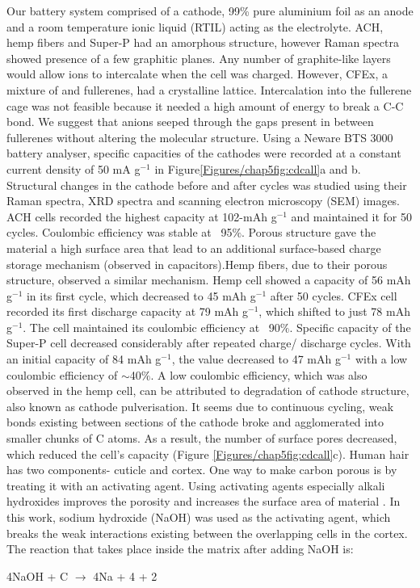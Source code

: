 Our battery system comprised of a cathode, 99\% pure aluminium foil as an anode and a room temperature ionic liquid (RTIL) acting as the electrolyte. ACH, hemp fibers and Super-P had an amorphous structure, however Raman spectra showed presence of a few graphitic planes. Any number of graphite-like layers would allow  ions to intercalate when the cell was charged. However, CFEx, a mixture of  and  fullerenes, had a crystalline lattice. Intercalation into the fullerene cage was not feasible because it needed a high amount of energy to break a C-C bond. We suggest that  anions seeped through the gaps present in between fullerenes without altering the molecular structure. Using a Neware BTS 3000 battery analyser, specific capacities of the cathodes were recorded at a constant current density of 50 mA g$^{-1}$ in Figure\ref{Figures/chap5fig:cdcall}a and b. Structural changes in the cathode before and after cycles was studied using their Raman spectra, XRD spectra and scanning electron microscopy (SEM) images.
ACH cells recorded the highest capacity at 102-mAh g$^{-1}$ and maintained it for 50 cycles. Coulombic efficiency was stable at ~95$\%$. Porous structure gave the material a high surface area that lead to an additional surface-based charge storage mechanism (observed in capacitors).Hemp fibers, due to their porous structure, observed a similar mechanism. Hemp cell showed a capacity of 56 mAh g$^{-1}$ in its first cycle, which decreased to 45 mAh g$^{-1}$ after 50 cycles. 
CFEx cell recorded its first discharge capacity at 79 mAh g$^{-1}$, which shifted to just 78 mAh g$^{-1}$. The cell maintained its coulombic efficiency at ~90$\%$. 
Specific capacity of the Super-P cell decreased considerably after repeated charge/ discharge cycles. With an initial capacity of 84 mAh g$^{-1}$, the value decreased to 47 mAh g$^{-1}$ with a low coulombic efficiency of $\sim$40$\%$. 
A low coulombic efficiency, which was also observed in the hemp cell, can be attributed to degradation of cathode structure, also known as cathode pulverisation. It seems due to continuous cycling, weak bonds existing between sections of the cathode broke and agglomerated into smaller chunks of C atoms. As a result, the number of surface pores decreased, which reduced the cell's capacity (Figure \ref{Figures/chap5fig:cdcall}c). 
Human hair has two components- cuticle and cortex. One way to make carbon porous is by treating it with an activating agent. Using activating agents especially alkali hydroxides improves the porosity and increases the surface area of material \cite{liu_hair-based_2017} .
In this work, sodium hydroxide (NaOH) was used as the activating agent, which breaks the weak interactions existing between the overlapping cells in the cortex. The reaction that takes place inside the matrix after adding NaOH is:
\begin{center}
    4NaOH + C $\longrightarrow$ 4Na + 4 + 2 \cite{qian_human_2013}
\end{center}


